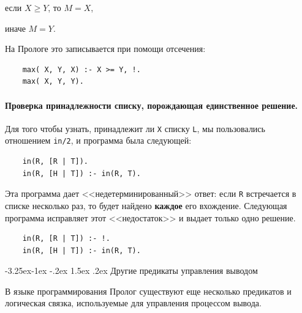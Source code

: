 \documentclass[12pt, openany, twoside]{book} %
\makeatletter
\renewcommand\subsection{\@startsection{subsection}{2}{\z@}%
                                     {-3.25ex\@plus -1ex \@minus -.2ex}%
                                     {1.5ex \@plus .2ex}%
                                     {\normalfont\normalsize\bfseries}}
\makeatother
\begin{document}
если $X \geq Y$, то $M = X$,

иначе $M = Y$.

На Прологе это записывается при помощи отсечения:
{\tt \begin{verbatim}
    max( X, Y, X) :- X >= Y, !.
    max( X, Y, Y).
\end{verbatim}}

\paragraph{Проверка принадлежности списку, порождающая един\-ствен\-ное
решение.} Для того чтобы узнать, принадлежит ли {\tt X} списку {\tt L}, мы пользовались отношением {\tt in/2}, и программа была следующей:
{\tt \begin{verbatim}
    in(R, [R | Т]).
    in(R, [H | Т]) :- in(R, T).
\end{verbatim}}

\noindent Эта программа дает <<недетерминированный>> ответ: если {\tt R} встречается в списке несколько раз, то будет найдено {\bf каждое} его вхождение. Следующая программа исправляет этот <<недостаток>> и выдает только одно решение.
{\tt \begin{verbatim}
    in(R, [R | Т]) :- !.
    in(R, [H | Т]) :- in(R, T).
\end{verbatim}}

\subsection{Другие предикаты управления выводом}

В языке программирования Пролог существуют еще несколько предикатов и логическая связка, используемые для управления процессом вывода.
\end{document}
